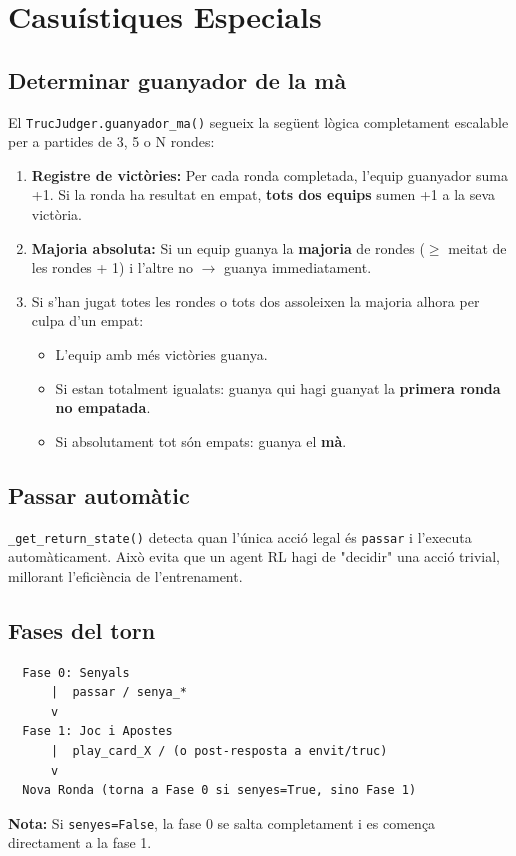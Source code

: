 \documentclass[a4paper,11pt]{report}
\begin{document}
\hrulefill

\section{Casuístiques Especials}
\subsection{Determinar guanyador de la mà}

El \texttt{TrucJudger.guanyador\_ma()} segueix la següent lògica completament escalable per a partides de 3, 5 o N rondes:
\begin{enumerate}
    \item \textbf{Registre de victòries:} Per cada ronda completada, l'equip guanyador suma +1. Si la ronda ha resultat en empat, \textbf{tots dos equips} sumen +1 a la seva victòria.
    \item \textbf{Majoria absoluta:} Si un equip guanya la \textbf{majoria} de rondes ($\ge$ meitat de les rondes + 1) i l'altre no $\rightarrow$ guanya immediatament.
    \item Si s'han jugat totes les rondes o tots dos assoleixen la majoria alhora per culpa d'un empat:
    \begin{itemize}
        \item L'equip amb més victòries guanya.
        \item Si estan totalment igualats: guanya qui hagi guanyat la \textbf{primera ronda no empatada}.
        \item Si absolutament tot són empats: guanya el \textbf{mà}.
    \end{itemize}
\end{enumerate}

\subsection{Passar automàtic}

\texttt{\_get\_return\_state()} detecta quan l'única acció legal és \texttt{passar} i l'executa automàticament. Això evita que un agent RL hagi de "decidir" una acció trivial, millorant l'eficiència de l'entrenament.

\subsection{Fases del torn}

\begin{samepage}
\begin{verbatim}
  Fase 0: Senyals
      |  passar / senya_*
      v
  Fase 1: Joc i Apostes
      |  play_card_X / (o post-resposta a envit/truc)
      v
  Nova Ronda (torna a Fase 0 si senyes=True, sino Fase 1)
\end{verbatim}
\end{samepage}

\noindent\textbf{Nota:}
Si \texttt{senyes=False}, la fase 0 se salta completament i es comença directament a la fase 1.
\end{document}
